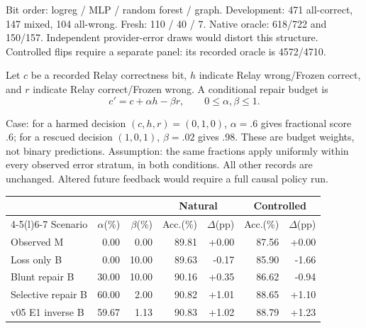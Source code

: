 \documentclass[10pt,letterpaper]{article}
\newcommand{\B}[1]{{\color{GuideBlue}#1}}
\newcommand{\note}[1]{{\fontsize{8.5}{10.5}\selectfont #1\par}}
\newcommand{\sect}[1]{\vspace{5pt}{\large\bfseries #1}\par\vspace{2pt}}
\newenvironment{clean}{\begin{center}\fontsize{9.5}{11.5}\selectfont\setlength{\tabcolsep}{6pt}\renewcommand{\arraystretch}{1.06}}{\end{center}}
\begin{document}
\note{Bit order: logreg / MLP / random forest / graph. Development: 471 all-correct, 147 mixed, 104 all-wrong. Fresh: 110 / 40 / 7. Native oracle: 618/722 and 150/157. Independent provider-error draws would distort this structure. Controlled flips require a separate panel: its recorded oracle is 4572/4710.}
\newpage
\sect{E1--E2 / body Table 4 and Figure 3: one shared budget}
Let $c$ be a recorded Relay correctness bit, $h$ indicate Relay wrong/Frozen correct,
and $r$ indicate Relay correct/Frozen wrong. A conditional repair budget is
$$c'=c+\alpha h-\beta r,\qquad 0\leq\alpha,\beta\leq1.$$
\note{Case: for a harmed decision $(c,h,r)=(0,1,0)$, $\alpha=.6$ gives fractional score .6;
for a rescued decision $(1,0,1)$, $\beta=.02$ gives .98. These are budget weights, not binary predictions.
Assumption: the same fractions apply uniformly within every observed error stratum, in both conditions.
All other records are unchanged. Altered future feedback would require a full causal policy run.}
\par\noindent\begin{minipage}{\linewidth}\end{minipage}\par
\begin{clean}\begin{tabular}{@{}lrrrrrr@{}}
\toprule
& & & \multicolumn{2}{c}{Natural} & \multicolumn{2}{c}{Controlled} \\ \cmidrule(lr){4-5}\cmidrule(l){6-7} Scenario & $\alpha$(\%) & $\beta$(\%) & Acc.(\%) & $\Delta$(pp) & Acc.(\%) & $\Delta$(pp) \\
\midrule
Observed M & 0.00 & 0.00 & 89.81 & +0.00 & 87.56 & +0.00 \\
\B{Loss only B} & \B{0.00} & \B{10.00} & \B{89.63} & \B{-0.17} & \B{85.90} & \B{-1.66} \\
\B{Blunt repair B} & \B{30.00} & \B{10.00} & \B{90.16} & \B{+0.35} & \B{86.62} & \B{-0.94} \\
\B{Selective repair B} & \B{60.00} & \B{2.00} & \B{90.82} & \B{+1.01} & \B{88.65} & \B{+1.10} \\
\B{v05 E1 inverse B} & \B{59.67} & \B{1.13} & \B{90.83} & \B{+1.02} & \B{88.79} & \B{+1.23} \\
\bottomrule\end{tabular}\end{clean}
\end{document}
